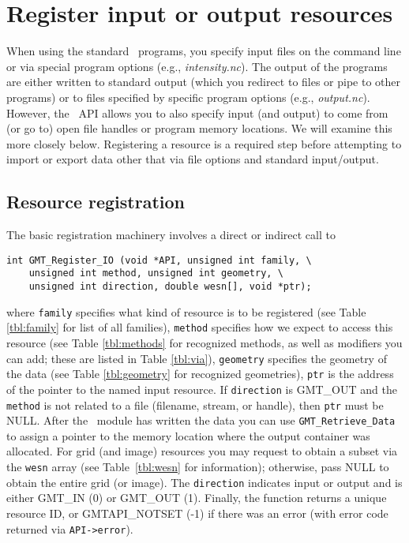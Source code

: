 \documentclass[11pt]{report}
\begin{document}
\section{Register input or output resources}

When using the standard \GMT\ programs, you specify input files on
the command line or via special program options (e.g., \emph{intensity.nc}). The output of
the programs are either written to standard output (which you redirect to files or pipe to other programs)
or to files specified by specific program options (e.g., \emph{output.nc}).  However, the
\GMT\ API allows you to also specify input (and output) to come from (or go to) open file handles
or program memory locations.  We will examine this more closely below.  Registering a
resource is a required step before attempting to import or export data other that via file options
and standard input/output.

\subsection{Resource registration}
The basic registration machinery involves a direct or indirect call to

\begin{verbatim}
int GMT_Register_IO (void *API, unsigned int family, \
    unsigned int method, unsigned int geometry, \
    unsigned int direction, double wesn[], void *ptr);
\end{verbatim}
where \texttt{family} specifies what kind of resource is to be registered
(see Table \ref{tbl:family} for list of all families), \texttt{method} specifies
how we expect to access this resource (see Table \ref{tbl:methods} for recognized methods,
as well as modifiers you can add; these are listed in Table \ref{tbl:via}),
\texttt{geometry} specifies
the geometry of the data (see Table \ref{tbl:geometry} for recognized geometries),
\texttt{ptr} is the address of the pointer to the named input resource.  If \texttt{direction}
is GMT\_OUT and the \texttt{method} is not related to a file (filename, stream, or handle),
then \texttt{ptr} must be NULL.  After the \GMT\ module has written the data you can use
\texttt{GMT\_Retrieve\_Data} to assign a pointer to the memory location where the output container was allocated.
For grid (and image) resources you may request to obtain a subset via the \texttt{wesn}
array (see Table~\ref{tbl:wesn} for information); otherwise, pass NULL to obtain the entire grid (or image).
The \texttt{direction} indicates input or output and is either GMT\_IN (0) or GMT\_OUT (1).
Finally, the function returns a unique resource ID, or GMTAPI\_NOTSET (-1) if there was an
error (with error code returned via \texttt{API->error}).
\end{document}
